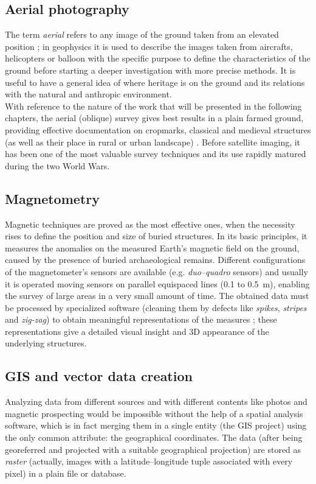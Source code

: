         \subsection{Aerial photography}
            The term \emph{aerial} refers to any image of the ground taken from an elevated position \cite{wiki:aerial}; in geophysics it is used to describe the images taken from aircrafts, helicopters or balloon with the specific purpose to define the characteristics of the ground before starting a deeper investigation with more precise methods. It is useful to have a general idea of where heritage is on the ground and its relations with the natural and anthropic environment.\\
            With reference to the nature of the work that will be presented in the following chapters, the aerial (oblique) survey gives best results in a plain farmed ground, providing effective documentation on cropmarks, classical and medieval structures (as well as their place in rural or urban landscape) \cite[pp.~11--12]{arch-site-detection}. Before satellite imaging, it has been one of the most valuable survey techniques and its use rapidly matured during the two World Wars.
            
        \subsection{Magnetometry}
            Magnetic techniques are proved as the most effective ones, when the necessity rises to define the position and size of buried structures. In its basic principles, it measures the anomalies on the measured Earth's magnetic field on the ground, caused by the presence of buried archaeological remains. Different configurations of the magnetometer's sensors are available (e.g. \emph{duo--quadro} sensors) and usually it is operated moving sensors on parallel equispaced lines (\num{0.1} to \SI{0.5}{\meter}), enabling the survey of large areas in a very small amount of time. The obtained data must be processed by specialized software (cleaning them by defects like \emph{spikes}, \emph{stripes} and \emph{zig-zag}) to obtain meaningful representations of the measures \cite[p.~47]{remote-ciminale}; these representations give a detailed visual insight and 3D appearance of the underlying structures.

        \subsection{GIS and vector data creation}
            Analyzing data from different sources and with different contents like photos and magnetic prospecting would be impossible without the help of a spatial analysis software, which is in fact merging them in a single entity (the GIS project) using the only common attribute: the geographical coordinates. The data (after being georeferred and projected with a suitable geographical projection) are stored as \emph{raster} (actually, images with a latitude--longitude tuple associated with every pixel) in a plain file or database.\\

